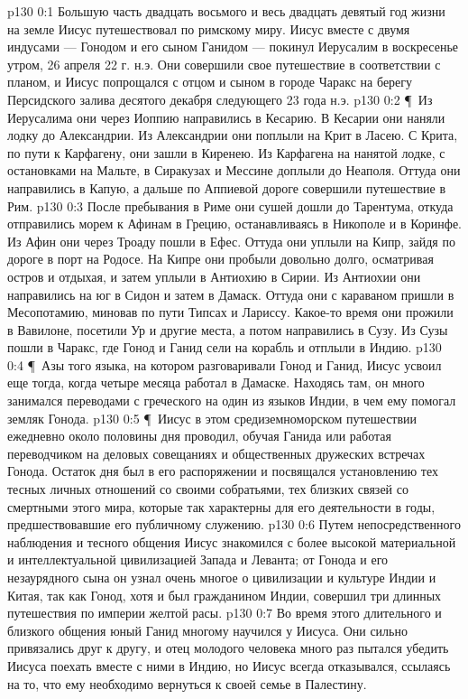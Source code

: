 \vs p130 0:1 Большую часть двадцать восьмого и весь двадцать девятый год жизни на земле Иисус путешествовал по римскому миру. Иисус вместе с двумя индусами --- Гонодом и его сыном Ганидом --- покинул Иерусалим в воскресенье утром, 26 апреля 22 г. н.э. Они совершили свое путешествие в соответствии с планом, и Иисус попрощался с отцом и сыном в городе Чаракс на берегу Персидского залива десятого декабря следующего 23 года н.э.
\vs p130 0:2 \P\ Из Иерусалима они через Иоппию направились в Кесарию. В Кесарии они наняли лодку до Александрии. Из Александрии они поплыли на Крит в Ласею. С Крита, по пути к Карфагену, они зашли в Киренею. Из Карфагена на нанятой лодке, с остановками на Мальте, в Сиракузах и Мессине доплыли до Неаполя. Оттуда они направились в Капую, а дальше по Аппиевой дороге совершили путешествие в Рим.
\vs p130 0:3 После пребывания в Риме они сушей дошли до Тарентума, откуда отправились морем к Афинам в Грецию, останавливаясь в Никополе и в Коринфе. Из Афин они через Троаду пошли в Ефес. Оттуда они уплыли на Кипр, зайдя по дороге в порт на Родосе. На Кипре они пробыли довольно долго, осматривая остров и отдыхая, и затем уплыли в Антиохию в Сирии. Из Антиохии они направились на юг в Сидон и затем в Дамаск. Оттуда они с караваном пришли в Месопотамию, миновав по пути Типсах и Лариссу. Какое\hyp{}то время они прожили в Вавилоне, посетили Ур и другие места, а потом направились в Сузу. Из Сузы пошли в Чаракс, где Гонод и Ганид сели на корабль и отплыли в Индию.
\vs p130 0:4 \P\ Азы того языка, на котором разговаривали Гонод и Ганид, Иисус усвоил еще тогда, когда четыре месяца работал в Дамаске. Находясь там, он много занимался переводами с греческого на один из языков Индии, в чем ему помогал земляк Гонода.
\vs p130 0:5 \P\ Иисус в этом средиземноморском путешествии ежедневно около половины дня проводил, обучая Ганида или работая переводчиком на деловых совещаниях и общественных дружеских встречах Гонода. Остаток дня был в его распоряжении и посвящался установлению тех тесных личных отношений со своими собратьями, тех близких связей со смертными этого мира, которые так характерны для его деятельности в годы, предшествовавшие его публичному служению.
\vs p130 0:6 Путем непосредственного наблюдения и тесного общения Иисус знакомился с более высокой материальной и интеллектуальной цивилизацией Запада и Леванта; от Гонода и его незаурядного сына он узнал очень многое о цивилизации и культуре Индии и Китая, так как Гонод, хотя и был гражданином Индии, совершил три длинных путешествия по империи желтой расы.
\vs p130 0:7 Во время этого длительного и близкого общения юный Ганид многому научился у Иисуса. Они сильно привязались друг к другу, и отец молодого человека много раз пытался убедить Иисуса поехать вместе с ними в Индию, но Иисус всегда отказывался, ссылаясь на то, что ему необходимо вернуться к своей семье в Палестину.
